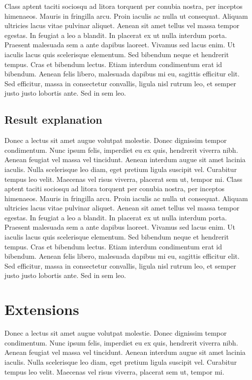\documentclass{article}
\begin{document}
\vspace{5mm}
Class aptent taciti sociosqu ad litora torquent per conubia nostra, per inceptos himenaeos. Mauris in fringilla arcu. Proin iaculis ac nulla ut consequat. Aliquam ultricies lacus vitae pulvinar aliquet. Aenean sit amet tellus vel massa tempor egestas. In feugiat a leo a blandit. In placerat ex ut nulla interdum porta. Praesent malesuada sem a ante dapibus laoreet. Vivamus sed lacus enim. Ut iaculis lacus quis scelerisque elementum. Sed bibendum neque et hendrerit tempus. Cras et bibendum lectus. Etiam interdum condimentum erat id bibendum. Aenean felis libero, malesuada dapibus mi eu, sagittis efficitur elit. Sed efficitur, massa in consectetur convallis, ligula nisl rutrum leo, et semper justo justo lobortis ante. Sed in sem leo.

\subsection{Result explanation}
Donec a lectus sit amet augue volutpat molestie. Donec dignissim tempor condimentum. Nunc ipsum felis, imperdiet
eu ex quis, hendrerit viverra nibh. Aenean feugiat vel massa vel tincidunt. Aenean interdum augue sit amet lacinia
iaculis. Nulla scelerisque leo diam, eget pretium ligula suscipit vel. Curabitur tempus leo velit. Maecenas vel
risus viverra, placerat sem ut, tempor mi.
\vspace{5mm}
Class aptent taciti sociosqu ad litora torquent per conubia nostra, per inceptos himenaeos. Mauris in fringilla arcu. Proin iaculis ac nulla ut consequat. Aliquam ultricies lacus vitae pulvinar aliquet. Aenean sit amet tellus vel massa tempor egestas. In feugiat a leo a blandit. In placerat ex ut nulla interdum porta. Praesent malesuada sem a ante dapibus laoreet. Vivamus sed lacus enim. Ut iaculis lacus quis scelerisque elementum. Sed bibendum neque et hendrerit tempus. Cras et bibendum lectus. Etiam interdum condimentum erat id bibendum. Aenean felis libero, malesuada dapibus mi eu, sagittis efficitur elit. Sed efficitur, massa in consectetur convallis, ligula nisl rutrum leo, et semper justo justo lobortis ante. Sed in sem leo.


\section{Extensions}
Donec a lectus sit amet augue volutpat molestie. Donec dignissim tempor condimentum. Nunc ipsum felis, imperdiet
eu ex quis, hendrerit viverra nibh. Aenean feugiat vel massa vel tincidunt. Aenean interdum augue sit amet lacinia
iaculis. Nulla scelerisque leo diam, eget pretium ligula suscipit vel. Curabitur tempus leo velit. Maecenas vel
risus viverra, placerat sem ut, tempor mi.
\end{document}
